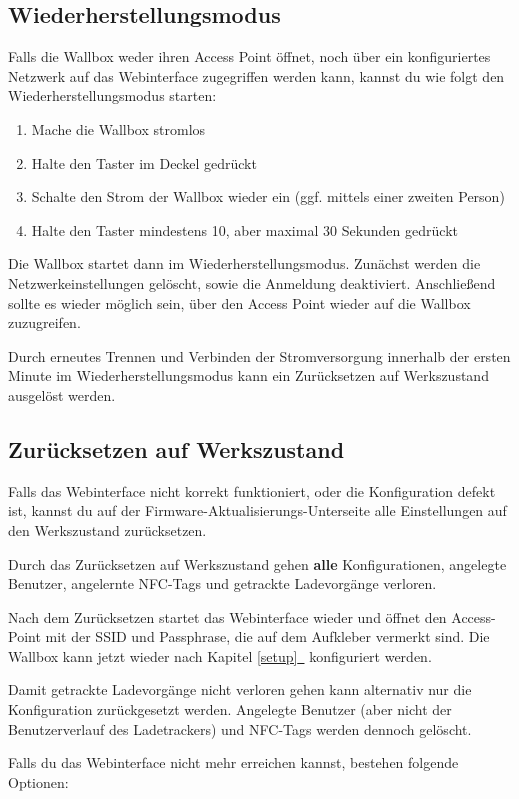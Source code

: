 \documentclass[a4paper,10pt]{article}
\newcommand{\hint}[1]{\begin{tcolorbox}[colback=boxgray,colframe=black,coltext=
white,title=Hinweis,left*=2mm,right*=2mm,boxsep=1mm,bottom=1mm,top=1mm]#1\end{tcolorbox}}
\newcommand*{\fullref}[1]{\hyperref[{#1}]{\ref*{#1}~\nameref*{#1}}}
\begin{document}
\begin{multicols*}{2}
	\subsection{Wiederherstellungsmodus}\label{recovery}
	Falls die Wallbox weder ihren Access Point öffnet, noch über ein konfiguriertes Netzwerk auf das Webinterface zugegriffen werden kann,
	kannst du wie folgt den Wiederherstellungsmodus starten:
	\begin{enumerate}
	 \item Mache die Wallbox stromlos
	 \item Halte den Taster im Deckel gedrückt
	 \item Schalte den Strom der Wallbox wieder ein (ggf. mittels einer zweiten Person)
	 \item Halte den Taster mindestens 10, aber maximal 30 Sekunden gedrückt
	\end{enumerate}
	Die Wallbox startet dann im Wiederherstellungsmodus. Zunächst werden die Netzwerkeinstellungen gelöscht, sowie die Anmeldung deaktiviert.
	Anschließend sollte es wieder möglich sein, über den Access Point wieder auf die Wallbox zuzugreifen.

	Durch erneutes Trennen und Verbinden der Stromversorgung innerhalb der ersten Minute im Wiederherstellungsmodus kann ein Zurücksetzen auf Werkszustand ausgelöst werden.

	\subsection{Zurücksetzen auf Werkszustand}\label{reset}
	Falls das Webinterface nicht korrekt funktioniert, oder die Konfiguration defekt ist,
	kannst du auf der Firmware-Aktualisierungs-Unterseite alle Einstellungen auf den Werkszustand zurücksetzen.
	\hint{Durch das Zurücksetzen auf Werkszustand gehen \mbox{\textbf{alle}} Konfigurationen, angelegte Benutzer, angelernte NFC-Tags und getrackte Ladevorgänge verloren.}
	Nach dem Zurücksetzen startet das Webinterface wieder und öffnet
	den Access-Point mit der SSID und Passphrase, die auf dem Aufkleber vermerkt
	sind. Die Wallbox kann jetzt wieder nach Kapitel \fullref{setup} konfiguriert werden.

	Damit getrackte Ladevorgänge nicht verloren gehen kann alternativ nur die Konfiguration zurückgesetzt werden.
	Angelegte Benutzer (aber nicht der Benutzerverlauf des Ladetrackers) und NFC-Tags werden dennoch gelöscht.

	Falls du das Webinterface nicht mehr erreichen kannst, bestehen folgende Optionen:


\end{multicols*}
\end{document}
